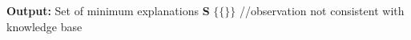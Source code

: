    \begin{algorithm}[t!]
    \begin{algorithmic}[1]
    	\State \textbf{Output:} Set of minimum explanations \textbf{S}
			\State \Return $\{\{\}\}$   //observation not consistent with knowledge base 
		\EndIf
		
%		
%		
		\EndFunction
    \end{algorithmic}
\end{algorithm}
